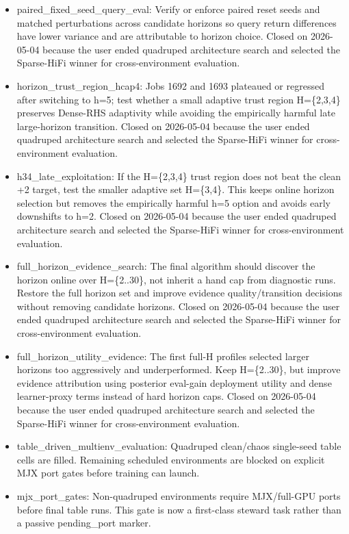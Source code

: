 \begin{itemize}
\item paired\_fixed\_seed\_query\_eval: Verify or enforce paired reset seeds and matched perturbations across candidate horizons so query return differences have lower variance and are attributable to horizon choice. Closed on 2026-05-04 because the user ended quadruped architecture search and selected the Sparse-HiFi winner for cross-environment evaluation.
\item horizon\_trust\_region\_hcap4: Jobs 1692 and 1693 plateaued or regressed after switching to h=5; test whether a small adaptive trust region H=\{2,3,4\} preserves Dense-RHS adaptivity while avoiding the empirically harmful late large-horizon transition. Closed on 2026-05-04 because the user ended quadruped architecture search and selected the Sparse-HiFi winner for cross-environment evaluation.
\item h34\_late\_exploitation: If the H=\{2,3,4\} trust region does not beat the clean +2 target, test the smaller adaptive set H=\{3,4\}. This keeps online horizon selection but removes the empirically harmful h=5 option and avoids early downshifts to h=2. Closed on 2026-05-04 because the user ended quadruped architecture search and selected the Sparse-HiFi winner for cross-environment evaluation.
\item full\_horizon\_evidence\_search: The final algorithm should discover the horizon online over H=\{2..30\}, not inherit a hand cap from diagnostic runs. Restore the full horizon set and improve evidence quality/transition decisions without removing candidate horizons. Closed on 2026-05-04 because the user ended quadruped architecture search and selected the Sparse-HiFi winner for cross-environment evaluation.
\item full\_horizon\_utility\_evidence: The first full-H profiles selected larger horizons too aggressively and underperformed. Keep H=\{2..30\}, but improve evidence attribution using posterior eval-gain deployment utility and dense learner-proxy terms instead of hard horizon caps. Closed on 2026-05-04 because the user ended quadruped architecture search and selected the Sparse-HiFi winner for cross-environment evaluation.
\item table\_driven\_multienv\_evaluation: Quadruped clean/chaos single-seed table cells are filled. Remaining scheduled environments are blocked on explicit MJX port gates before training can launch.
\item mjx\_port\_gates: Non-quadruped environments require MJX/full-GPU ports before final table runs. This gate is now a first-class steward task rather than a passive pending\_port marker.
\end{itemize}
